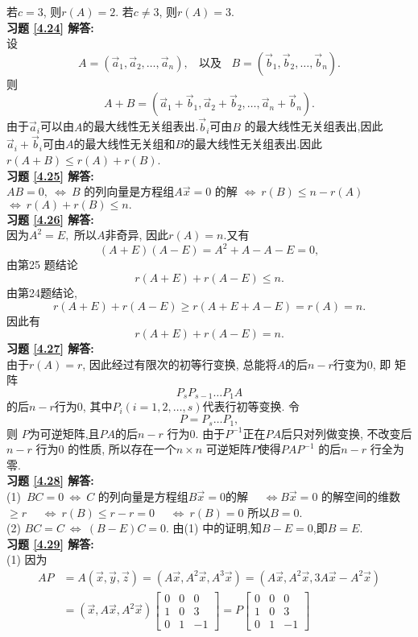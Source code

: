 若$c=3$, 则$r(A)=2$. 若$c\not=3$, 则$r(A)=3$.\\
\textbf{习题 \ref{4.24} 解答:}\\
设$$A=(\vec{a}_1,\vec{a}_2,\dots,\vec{a}_n),\ \ \ \ \mbox{以及}\ \ \ \   B=(\vec{b}_1,\vec{b}_2,\dots,\vec{b}_n).$$
则$$A+B=(\vec{a}_1+\vec{b}_1,\vec{a}_2+\vec{b}_2,\dots,\vec{a}_n+\vec{b}_n).$$
由于$\vec{a}_i$可以由$A$的最大线性无关组表出.$\vec{b}_i$可由$B$ 的最大线性无关组表出,因此$\vec{a}_i+\vec{b}_i$可由$A$的最大线性无关组和$B$的最大线性无关组表出.因此$r(A+B)\leq r(A)+r(B)$.\\
\textbf{习题 \ref{4.25} 解答:}\\
$AB=0,\ \Leftrightarrow \ B$ 的列向量是方程组$A\vec{x}=0$ 的解
  \quad  \quad  \quad \quad   $\Leftrightarrow\  r(B)\leq n-r(A)$
   \quad  \quad  \quad \quad  $\Leftrightarrow\ r(A)+r(B)\leq n.$\\
\textbf{习题 \ref{4.26} 解答:}\\
因为$A^2=E,$ 所以$A$非奇异, 因此$r(A)=n.$又有$$(A+E)(A-E)=A^2+A-A-E=0,$$ 由第25 题结论$$r(A+E)+r(A-E)\leq n.$$ 由第24题结论,  $$r(A+E)+r(A-E)\geq r(A+E+A-E)=r(A)=n.$$
因此有$$r(A+E)+r(A-E)=n.$$
\textbf{习题 \ref{4.27} 解答:}\\
由于$r(A)=r$, 因此经过有限次的初等行变换, 总能将$A$的后$n-r$行变为0, 即 矩阵$$P_sP_{s-1}\dots P_1A$$的后$n-r$行为0, 其中$P_i(i=1,2,\dots,s)$代表行初等变换. 令$$P=P_s\dots P_1,$$ 则
$P$为可逆矩阵,且$PA$的后$n-r$ 行为0. 由于$P^{-1}$正在$PA$后只对列做变换, 不改变后$n-r$ 行为0 的性质, 所以存在一个$n\times n$ 可逆矩阵$P$使得$PAP^{-1}$ 的后$n-r$ 行全为零.\\
\textbf{习题 \ref{4.28} 解答:}\\
(1)\ $BC=0\ \Leftrightarrow \ C$ 的列向量是方程组$B\vec{x}=0$的解
\quad \quad \quad \quad \quad  \ \ $ \Leftrightarrow B\vec{x}=0$ 的解空间的维数$\geq r$
\quad \quad \quad \quad \quad  \ \  $ \Leftrightarrow\ r(B)\leq r-r=0$
\quad \quad \quad \quad \quad  \ \  $ \Leftrightarrow\ r(B)=0$
所以$B=0$.\\
(2) $BC=C \ \Leftrightarrow \ (B-E)C=0$. 由(1) 中的证明,知$B-E=0$,即$B=E$.\\
\textbf{习题 \ref{4.29} 解答:}\\
(1) 因为\begin{displaymath}\begin{aligned}AP&=A(\vec{x},\vec{y},\vec{z})=(A\vec{x},A^2\vec{x},A^3\vec{x})=(A\vec{x},A^2\vec{x},3A\vec{x}-A^2\vec{x})\\
&=(\vec{x},A\vec{x},A^2\vec{x})\begin{bmatrix}0&0&0\\1&0&3\\0&1&-1\end{bmatrix}=P\begin{bmatrix}0&0&0\\1&0&3\\0&1&-1\end{bmatrix}\end{aligned}\end{displaymath}
